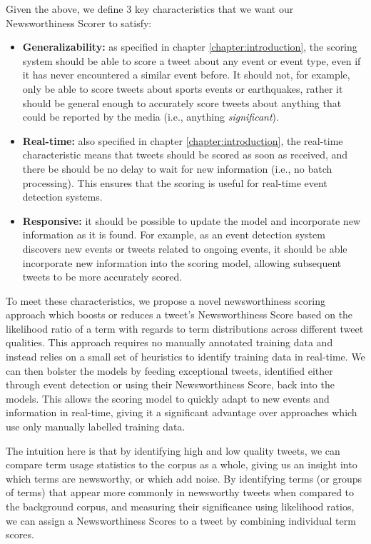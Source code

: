 Given the above, we define 3 key characteristics that we want our Newsworthiness Scorer to satisfy:
\begin{itemize}
	\item \textbf{Generalizability:} as specified in chapter \ref{chapter:introduction}, the scoring system should be able to score a tweet about any event or event type, even if it has never encountered a similar event before. It should not, for example, only be able to score tweets about sports events or earthquakes, rather it should be general enough to accurately score tweets about anything that could be reported by the media (i.e., anything \emph{significant}).
	\item \textbf{Real-time:} also specified in chapter \ref{chapter:introduction}, the real-time characteristic means that tweets should be scored as soon as received, and there be should be no delay to wait for new information (i.e., no batch processing). This ensures that the scoring is useful for real-time event detection systems.
	\item \textbf{Responsive:} it should be possible to update the model and incorporate new information as it is found. For example, as an event detection system discovers new events or tweets related to ongoing events, it should be able incorporate new information into the scoring model, allowing subsequent tweets to be more accurately scored.
\end{itemize}

To meet these characteristics, we propose a novel newsworthiness scoring approach which boosts or reduces a tweet's Newsworthiness Score based on the likelihood ratio of a term with regards to term distributions across different tweet qualities.
This approach requires no manually annotated training data and instead relies on a small set of heuristics to identify training data in real-time. We can then bolster the models by feeding exceptional tweets, identified either through event detection or using their Newsworthiness Score, back into the models.
This allows the scoring model to quickly adapt to new events and information in real-time, giving it a significant advantage over approaches which use only manually labelled training data.

The intuition here is that by identifying high and low quality tweets, we can compare term usage statistics to the corpus as a whole, giving us an insight into which terms are newsworthy, or which add noise.
By identifying terms (or groups of terms) that appear more commonly in newsworthy tweets when compared to the background corpus, and measuring their significance using likelihood ratios, we can assign a Newsworthiness Scores to a tweet by combining individual term scores.

